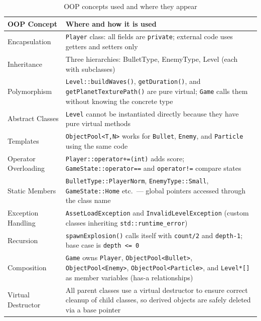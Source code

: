 \documentclass[11pt]{article}
\begin{document}
\begin{table}[htbp]
    \centering
    \caption{OOP concepts used and where they appear}
    \label{tab:oop}
    \renewcommand{\arraystretch}{1.4}
    \begin{tabular}{|l|p{9cm}|}
        \hline
        \textbf{OOP Concept} & \textbf{Where and how it is used} \\
        \hline
        Encapsulation & \texttt{Player} class: all fields are \texttt{private}; external code uses getters and setters only \\
        \hline
        Inheritance & Three hierarchies: BulletType, EnemyType, Level (each with subclasses)\\
        \hline
        Polymorphism & \texttt{Level::buildWaves()}, \texttt{getDuration()}, and \texttt{getPlanetTexturePath()} are pure virtual; \texttt{Game} calls them without knowing the concrete type \\
        \hline
        Abstract Classes & \texttt{Level} cannot be instantiated directly because they have pure virtual methods\\
        \hline
        Templates & \texttt{ObjectPool<T,N>} works for \texttt{Bullet}, \texttt{Enemy}, and \texttt{Particle} using the same code \\
        \hline
        Operator Overloading & \texttt{Player::operator+=(int)} adds score; \texttt{GameState::operator==} and \texttt{operator!=} compare states \\
        \hline
        Static Members & \texttt{BulletType::PlayerNorm}, \texttt{EnemyType::Small}, \texttt{GameState::Home} etc.\ --- global pointers accessed through the class name\\
        \hline
        Exception Handling & \texttt{AssetLoadException} and \texttt{InvalidLevelException} (custom classes inheriting \texttt{std::runtime\_error}) \\
        \hline
        Recursion & \texttt{spawnExplosion()} calls itself with \texttt{count/2} and \texttt{depth-1}; base case is \texttt{depth <= 0} \\
        \hline
        Composition & \texttt{Game} owns \texttt{Player}, \texttt{ObjectPool<Bullet>}, \texttt{ObjectPool<Enemy>}, \texttt{ObjectPool<Particle>}, and \texttt{Level*[]} as member variables (has-a relationships) \\
        \hline
        Virtual Destructor & All parent classes use a virtual destructor to ensure correct cleanup of child classes, so derived objects are safely deleted via a base pointer\\
        \hline
    \end{tabular}
\end{table}
\end{document}
